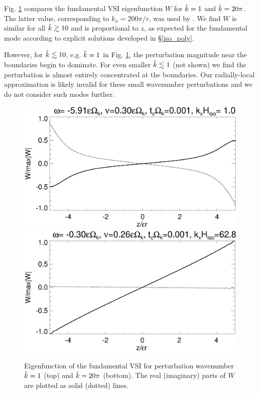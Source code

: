 Fig. \ref{lowfreq_eigenfunc} compares the fundamental VSI eigenfunction
$W$ for $\hat{k}=1$ and $\hat{k}=20\pi$. The latter value, corresponding
to $k_x= 200\pi/r$, was used by \cite{mcnally14}. We find $W$ is
similar for all $\hat{k}\gtrsim10$ and is proportional to $z$, as
expected for the fundamental mode according to explicit solutions
developed in \S\ref{iso_poly}.  

However, for $\hat{k}\lesssim 10$, e.g. $\hat{k}=1$ in 
Fig. \ref{lowfreq_eigenfunc}, the perturbation magnitude near the
boundaries begin to dominate. For even smaller $\hat{k}\lesssim 1$ (not
shown) we find the perturbation is almost entirely concentrated at the
boundaries. Our radially-local approximation is likely invalid for 
these small wavenumber perturbations and we do not consider such modes
further.      

\begin{figure}
  \includegraphics[width=\linewidth,clip=true,trim=0cm 1.75cm 0cm
  0cm]{figures/eigenvector_iso_kx1} 
  \includegraphics[width=\linewidth]{figures/eigenvector_iso_kx60}
  \caption{Eigenfunction of the fundamental VSI for perturbation
    wavenumber $\hat{k}=1$ (top) and $\hat{k}=20\pi$ (bottom). The real 
    (imaginary) parts of $W$ are plotted as solid (dotted) lines. 
    \label{lowfreq_eigenfunc}
  }
\end{figure}

